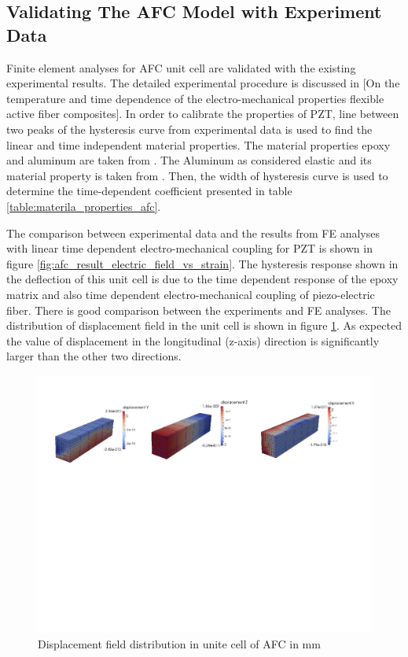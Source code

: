 \subsection{Validating The AFC Model with Experiment Data}
Finite element analyses for AFC unit cell are validated with the existing experimental results.
The detailed experimental procedure is discussed in [On the temperature and time dependence of the electro-mechanical properties flexible active fiber composites].
In order to calibrate the properties of PZT, line between two peaks of the hysteresis curve from experimental data is used to find the linear and time independent material properties.
The material properties epoxy and aluminum are taken from \cite{atitallah2014parametric}.
The Aluminum as considered elastic and its material property is taken from \cite{Aluminium_wikipedia}.
Then, the width of hysteresis curve is used to determine the time-dependent coefficient presented in table \ref{table:materila_properties_afc}.
 
The comparison between experimental data and the results from FE analyses with linear time dependent electro-mechanical coupling for PZT is shown in figure \ref{fig:afc_result_electric_field_vs_strain}.
The hysteresis response shown in the deflection of this unit cell is due to the time dependent response of the epoxy matrix and also time dependent electro-mechanical coupling of piezo-electric fiber. 
There is good comparison between the experiments and FE analyses.
The distribution of displacement field in the unit cell is shown in figure \ref{afc_displacement_all:fig}.
As expected the value of displacement in the longitudinal (z-axis) direction is significantly larger than the other two directions.

\begin{figure} 
\centering
\includegraphics[trim = 0mm 100mm 0mm 0mm,width=6.0in]{./chap_4_structural_analyses/afc_unit_cell/afc_displacement_all.pdf}
\caption{Displacement field distribution in unite cell of AFC in mm}
\label{afc_displacement_all:fig}
\end{figure}

